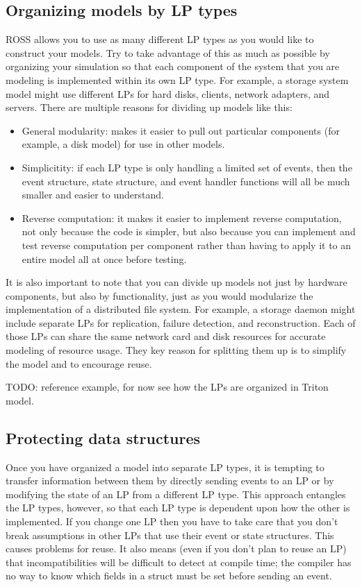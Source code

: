 \documentclass[conference,10pt,compsocconf,onecolumn]{IEEEtran}
\begin{document}
\subsection{Organizing models by LP types}

ROSS allows you to use as many different LP types as you would like to
construct your models.  Try to take advantage of this as much as possible by
organizing your simulation so that each component of the system that you are
modeling is implemented within its own LP type.  For example, a storage
system model might use different LPs for hard disks, clients, network
adapters, and servers.  There are multiple reasons for dividing up models
like this:

\begin{itemize}
\item General modularity: makes it easier to pull out particular components
(for example, a disk model) for use in other models.
\item Simplicitity: if each LP type is only handling a limited set of
events, then the event structure, state structure, and event handler
functions will all be much smaller and easier to understand.
\item Reverse computation: it makes it easier to implement reverse
computation, not only because the code is simpler, but also because you can
implement and test reverse computation per component rather than having to
apply it to an entire model all at once before testing.
\end{itemize}

It is also important to note that you can divide up models not just by
hardware components, but also by functionality, just as
you would modularize the implementation of a distributed file system.  For
example, a storage daemon might include separate LPs for replication, failure
detection, and reconstruction.  Each of those LPs can share the same network
card and disk resources for accurate modeling of resource usage.  They key
reason for splitting them up is to simplify the model and to encourage
reuse.

TODO: reference example, for now see how the LPs are organized in Triton
model.

\subsection{Protecting data structures}

Once you have organized a model into separate LP types, it is tempting to
transfer information between them by directly sending events to an LP or by
modifying the state of an LP from a different LP type.  This approach entangles the LP types,
however, so that each LP type is dependent upon how the other is
implemented.  If you change one LP then you have to take care that you don't
break assumptions in other LPs that use their event or state structures.  This causes
problems for reuse.  It also means (even if you don't plan to reuse an
LP) that incompatibilities will be difficult to detect at compile time; the
compiler has no way to know which fields in a struct must be set before
sending an event.
\end{document}
